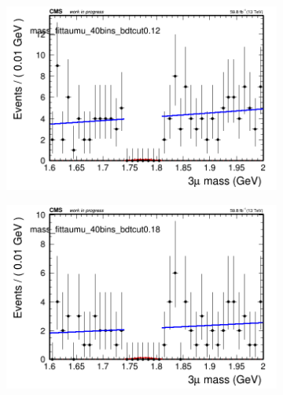 \begin{figure}[H]
\begin{subfigure}{0.2\textwidth}
        \caption{}
    \end{subfigure}
    \begin{subfigure}{0.2\textwidth}
        \includegraphics[width=\textwidth]{power_law/plots/taumu/massfit_taumu_40bins_bdtcut0.12.png}
        \caption{}
    \end{subfigure}
    \begin{subfigure}{0.2\textwidth}
        \includegraphics[width=\textwidth]{power_law/plots/taumu/massfit_taumu_40bins_bdtcut0.18.png}
        \caption{}
    \end{subfigure}
    \begin{subfigure}{0.2\textwidth}

\end{subfigure}
\end{figure}

